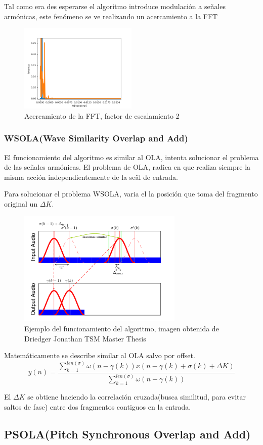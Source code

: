 \documentclass[../ASSD_TP2.tex]{subfiles}
\begin{document}
Tal como era des esperarse el algoritmo introduce modulación a se\~nales armónicas, este fenómeno se ve realizando un acercamiento a la FFT

\begin{figure}[H]
  \centering
   \includegraphics[width=0.5\textwidth]{figures/zoom.png}
  \caption{Acercamiento de la FFT, factor de escalamiento 2}
\end{figure}

\subsubsection*{WSOLA(Wave Similarity Overlap and Add)}
El funcionamiento del algoritmo es similar al OLA, intenta solucionar el problema de las se\~nales armónicas. El problema de OLA, radica en que realiza siempre la misma acción independientemente de la se\~al de entrada.
\par Para solucionar el problema WSOLA, varia el la posición que toma del fragmento original un $\Delta K$.

\begin{figure}[H]
  \centering
   \includegraphics[width=0.7\textwidth]{figures/wsola.png}
  \caption{Ejemplo del funcionamiento del algoritmo, imagen obtenida de Driedger Jonathan TSM Master Thesis}
\end{figure}

Matemáticamente se describe similar al OLA salvo por offset.
\begin{equation}
y(n)=\frac{\sum_{k=1}^{len(\sigma)} \omega(n - \gamma (k)) x(n-\gamma (k) + \sigma (k) + \Delta K)}{\sum_{k=1}^{len(\sigma)}\omega(n - \gamma (k))}
\end{equation}

El $\Delta K$ se obtiene haciendo la correlación cruzada(busca similitud, para evitar saltos de fase) entre dos fragmentos contiguos en la entrada.

\subsection*{PSOLA(Pitch Synchronous Overlap and Add)}
\end{document}
